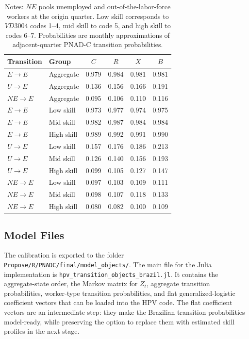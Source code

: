 \documentclass[12pt]{article}
\begin{document}
	\begin{table}[H]
		\centering
		\caption{Monthly Labor-Market Transition Probabilities Used in the Model Objects}
		\label{tab:labor-transition-calibration}
		\small
		\begin{tabular}{llcccc}
			\toprule
			Transition & Group & $C$ & $R$ & $X$ & $B$ \\
			\midrule
			$E\rightarrow E$ & Aggregate & 0.979 & 0.984 & 0.981 & 0.981 \\
			$U\rightarrow E$ & Aggregate & 0.136 & 0.156 & 0.166 & 0.191 \\
			$NE\rightarrow E$ & Aggregate & 0.095 & 0.106 & 0.110 & 0.116 \\
			\midrule
			$E\rightarrow E$ & Low skill & 0.973 & 0.977 & 0.974 & 0.975 \\
			$E\rightarrow E$ & Mid skill & 0.982 & 0.987 & 0.984 & 0.984 \\
			$E\rightarrow E$ & High skill & 0.989 & 0.992 & 0.991 & 0.990 \\
			$U\rightarrow E$ & Low skill & 0.157 & 0.176 & 0.186 & 0.213 \\
			$U\rightarrow E$ & Mid skill & 0.126 & 0.140 & 0.156 & 0.193 \\
			$U\rightarrow E$ & High skill & 0.099 & 0.105 & 0.127 & 0.147 \\
			$NE\rightarrow E$ & Low skill & 0.097 & 0.103 & 0.109 & 0.111 \\
			$NE\rightarrow E$ & Mid skill & 0.098 & 0.107 & 0.118 & 0.133 \\
			$NE\rightarrow E$ & High skill & 0.080 & 0.082 & 0.100 & 0.109 \\
			\bottomrule
		\end{tabular}
		\caption*{Notes: $NE$ pools unemployed and out-of-the-labor-force workers at the origin quarter. Low skill corresponds to $VD3004$ codes 1--4, mid skill to code 5, and high skill to codes 6--7. Probabilities are monthly approximations of adjacent-quarter PNAD-C transition probabilities.}
	\end{table}
	
	\subsection{Model Files}
	
	The calibration is exported to the folder \texttt{Propose/R/PNADC/final/model\_objects/}. The main file for the Julia implementation is \texttt{hpv\_transition\_objects\_brazil.jl}. It contains the aggregate-state order, the Markov matrix for $Z_t$, aggregate transition probabilities, worker-type transition probabilities, and flat generalized-logistic coefficient vectors that can be loaded into the HPV code. The flat coefficient vectors are an intermediate step: they make the Brazilian transition probabilities model-ready, while preserving the option to replace them with estimated skill profiles in the next stage.
\end{document}
